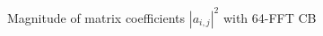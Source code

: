 \documentclass[xcolor=dvipsnames,aspectratio=169]{beamer}
\begin{document}
{\begin{figure}
 \centering
 \caption{Magnitude of matrix coefficients $|a_{i,j}|^2$ with 64-FFT CB}
\end{figure}

}
  
\end{document}
